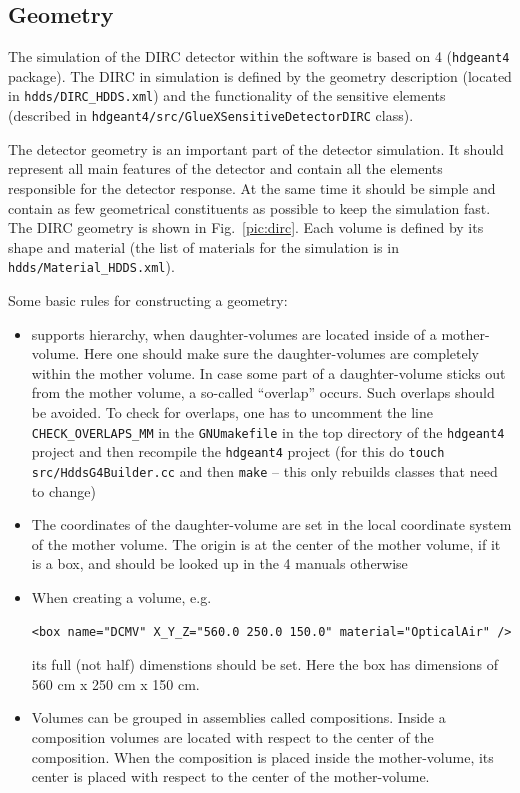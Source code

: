 \subsection{Geometry}

The simulation of the \gluex DIRC detector within the \gluex software is based on {\geant}4 (\texttt{hdgeant4} package). The \gluex DIRC in simulation is defined by the geometry description (located in  \texttt{hdds/DIRC{\_}HDDS.xml}) and the functionality of the sensitive elements (described in \texttt{hdgeant4/src/GlueXSensitiveDetectorDIRC} class). 

The detector geometry is an important part of the detector simulation. It should represent all main features of the detector and contain all the elements responsible for the detector response. At the same time it should be simple and contain as few geometrical constituents as possible to keep the simulation fast. The \gluex DIRC geometry is shown in Fig.~\ref{pic:dirc}. Each volume is defined by its shape and material (the list of materials for the \gluex simulation is in \texttt{hdds/Material{\_}HDDS.xml}). 

\vspace{0.5cm}
Some basic rules for constructing a \geant geometry:
\begin{itemize}
\item \geant supports hierarchy, when daughter-volumes are located inside of a mother-volume.  Here one should make sure the daughter-volumes are completely within the mother volume. In case some part of a daughter-volume sticks out from the mother volume, a so-called ``overlap'' occurs. Such overlaps should be avoided. To check for overlaps, one has to uncomment the line \texttt{CHECK{\_}OVERLAPS{\_}MM} in the \texttt{GNUmakefile} in the top directory of the \texttt{hdgeant4} project and then recompile the \texttt{hdgeant4} project (for this do \texttt{touch src/HddsG4Builder.cc} and then \texttt{make} -- this only rebuilds classes that need to change)
\item The coordinates of the daughter-volume are set in the local coordinate system of the mother volume. The origin is at the center of the mother volume, if it is a box, and should be looked up in the {\geant}4 manuals otherwise
\item When creating a volume, e.g.
\begin{center}
 \texttt{<box name="DCMV" X{\_}Y{\_}Z="560.0 250.0 150.0" material="OpticalAir" />} 
\end{center}
\noindent its full (not half) dimenstions should be set. Here the box has dimensions of 560 cm x 250 cm x 150 cm.
\item Volumes can be grouped in assemblies called compositions. Inside a composition volumes are located with respect to the center of the composition. When the composition is placed inside the mother-volume, its center is placed with respect to the center of the mother-volume.
\end{itemize} 

